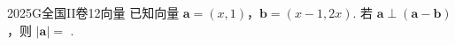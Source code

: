 
\begin{problem}{2025}{G}{全国II卷}{12}{向量}
已知向量 $\mathbf{a}=(x,1)$，$\mathbf{b}=(x-1, 2x)$. 若 $\mathbf{a} \perp (\mathbf{a}-\mathbf{b})$，则 $|\mathbf{a}|=$ \underline{\hspace{4em}}.
\end{problem}